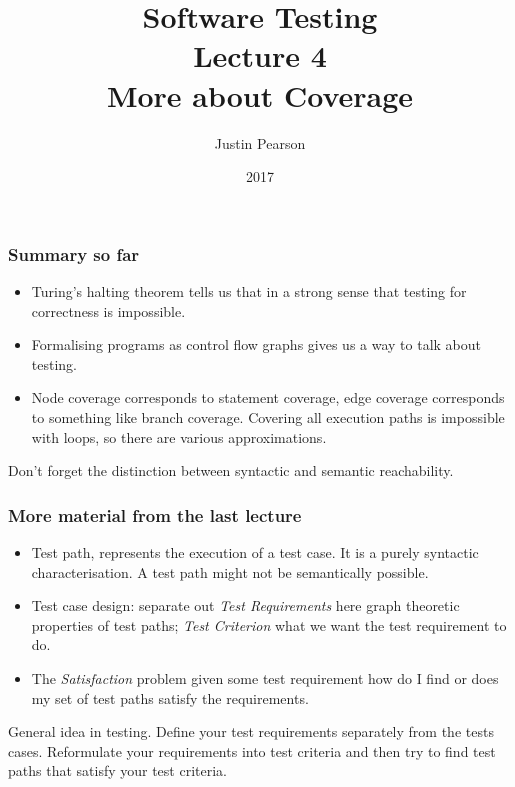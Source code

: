 \documentclass[handout]{beamer}
\title{Software Testing\\ Lecture 4\\ More about Coverage}
\author{Justin Pearson}
\date{2017}
\begin{document}
\lstset{language=C}

\begin{frame}
  \maketitle
\end{frame}
\begin{frame}
  \frametitle{Summary so far}
  \begin{itemize}
  \item Turing's halting theorem tells us that in a strong sense that testing
    for correctness is impossible.
  \item Formalising programs as control flow graphs gives us a way to talk
    about testing.
  \item Node coverage corresponds to statement coverage, edge coverage
    corresponds to something like branch coverage. Covering all execution
    paths is impossible with loops, so there are various approximations.
  \end{itemize}
  Don't forget the distinction between syntactic and semantic reachability. 
\end{frame}
\begin{frame}
  \frametitle{More material from the last lecture}
  \begin{itemize}
  \item Test path, represents the execution of a test case. It is a purely
    syntactic characterisation.  A test path might not be semantically
    possible.
    \item Test case design: separate out {\em Test Requirements} here graph
      theoretic properties of test paths; {\em Test Criterion} what we want
      the test requirement to do.
    \item The {\em Satisfaction} problem given some test requirement how do I
      find or does my set of test paths satisfy the requirements. 
    \end{itemize}
    General idea in testing. Define your test requirements separately from the
    tests cases. Reformulate your requirements into test criteria and then try
    to find test paths that satisfy your test criteria.
\end{frame}
 
\end{document}
